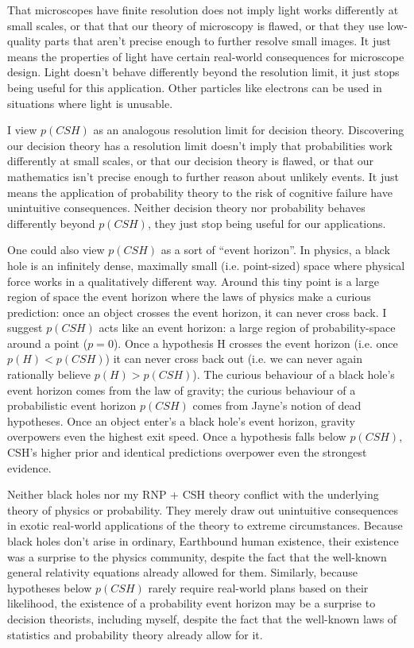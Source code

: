 \documentclass{article}
\begin{document}
That microscopes have finite resolution does not imply light works differently at small scales, or that that our theory of microscopy is flawed, or that they use low-quality parts that aren't precise enough to further resolve small images. It just means the properties of light have certain real-world consequences for microscope design. Light doesn't behave differently beyond the resolution limit, it just stops being useful for this application. Other particles like electrons can be used in situations where light is unusable.

I view \(p(CSH)\) as an analogous resolution limit for decision theory. Discovering our decision theory has a resolution limit doesn't imply that probabilities work differently at small scales, or that our decision theory is flawed, or that our mathematics isn't precise enough to further reason about unlikely events. It just means the application of probability theory to the risk of cognitive failure have unintuitive consequences. Neither decision theory nor probability behaves differently beyond \(p(CSH)\), they just stop being useful for our applications. 

One could also view \(p(CSH)\) as a sort of ``event horizon''. In physics, a black hole is an infinitely dense, maximally small (i.e. point-sized) space where physical force works in a qualitatively different way. Around this tiny point is a large region of space \textemdash{} the event horizon \textemdash{} where the laws of physics make a curious prediction: once an object crosses the event horizon, it can never cross back. I suggest \(p(CSH)\) acts like an event horizon: a large region of probability-space around a point (\(p=0\)). Once a hypothesis H crosses the event horizon (i.e. once \(p(H)<p(CSH)\)) it can never cross back out (i.e. we can never again rationally believe \(p(H)>p(CSH)\)). The curious behaviour of a black hole's event horizon comes from the law of gravity; the curious behaviour of a probabilistic event horizon \(p(CSH)\) comes from Jayne's notion of dead hypotheses. Once an object enter's a black hole's event horizon, gravity overpowers even the highest exit speed. Once a hypothesis falls below \(p(CSH)\), CSH's higher prior and identical predictions overpower even the strongest evidence. 

Neither black holes nor my RNP + CSH theory conflict with the underlying theory of physics or probability. They merely draw out unintuitive consequences in exotic real-world applications of the theory to extreme circumstances. Because black holes don't arise in ordinary, Earthbound human existence, their existence was a surprise to the physics community, despite the fact that the well-known general relativity equations already allowed for them. Similarly, because hypotheses below \(p(CSH)\) rarely require real-world plans based on their likelihood, the existence of a probability event horizon may be a surprise to decision theorists, including myself, despite the fact that the well-known laws of statistics and probability theory already allow for it.
\end{document}
